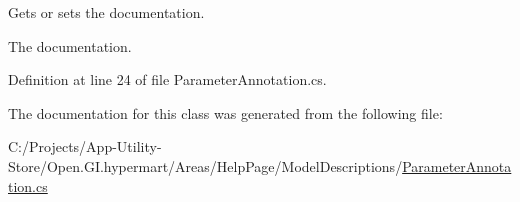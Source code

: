 Gets or sets the documentation. 

The documentation. 

Definition at line 24 of file Parameter\+Annotation.\+cs.



The documentation for this class was generated from the following file\+:\begin{DoxyCompactItemize}
\item 
C\+:/\+Projects/\+App-\/\+Utility-\/\+Store/\+Open.\+G\+I.\+hypermart/\+Areas/\+Help\+Page/\+Model\+Descriptions/\hyperlink{_parameter_annotation_8cs}{Parameter\+Annotation.\+cs}\end{DoxyCompactItemize}
